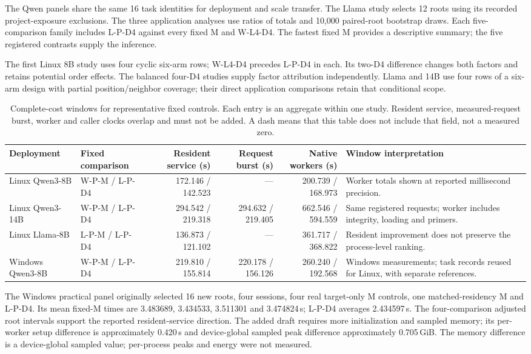 The Qwen panels share the same 16 task identities for deployment and scale transfer. The Llama study selects 12 roots using its recorded project-exposure exclusions. The three application analyses use ratios of totals and 10,000 paired-root bootstrap draws. Each five-comparison family includes L-P-D4 against every fixed M and W-L4-D4. The fastest fixed M provides a descriptive summary; the five registered contrasts supply the inference.

The first Linux 8B study uses four cyclic six-arm rows; W-L4-D4 precedes L-P-D4 in each. Its two-D4 difference changes both factors and retains potential order effects. The balanced four-D4 studies supply factor attribution independently. Llama and 14B use four rows of a six-arm design with partial position/neighbor coverage; their direct application comparisons retain that conditional scope.

\begin{table}[t]
\centering\footnotesize\tighttable
\caption{Complete-cost windows for representative fixed controls. Each entry is an aggregate within one study. Resident service, measured-request burst, worker and caller clocks overlap and must not be added. A dash means that this table does not include that field, not a measured zero.}
\label{tab:costs}
\begin{tabularx}{\textwidth}{@{}L{2.35cm}L{2.30cm}rrrY@{}}\toprule
Deployment & Fixed comparison & Resident service (s) & Request burst (s) & Native workers (s) & Window interpretation\\\midrule
Linux Qwen3-8B & W-P-M / L-P-D4 & 172.146 / 142.523 & --- & 200.739 / 168.973 & Worker totals shown at reported millisecond precision.\\
Linux Qwen3-14B & W-P-M / L-P-D4 & 294.542 / 219.318 & 294.632 / 219.405 & 662.546 / 594.559 & Same registered requests; worker includes integrity, loading and primers.\\
Linux Llama-8B & L-P-M / L-P-D4 & 136.873 / 121.102 & --- & 361.717 / 368.822 & Resident improvement does not preserve the process-level ranking.\\
Windows Qwen3-8B & W-P-M / L-P-D4 & 219.810 / 155.814 & 220.178 / 156.126 & 260.240 / 192.568 & Windows measurements; task records reused for Linux, with separate references.\\\bottomrule
\end{tabularx}
\end{table}

The Windows practical panel originally selected 16 new roots, four sessions, four real target-only M controls, one matched-residency M and L-P-D4. Its mean fixed-M times are 3.483689, 3.434533, 3.511301 and 3.474824\,s; L-P-D4 averages 2.434597\,s. The four-comparison adjusted root intervals support the reported resident-service direction. The added draft requires more initialization and sampled memory; its per-worker setup difference is approximately 0.420\,s and device-global sampled peak difference approximately 0.705\,GiB. The memory difference is a device-global sampled value; per-process peaks and energy were not measured.

